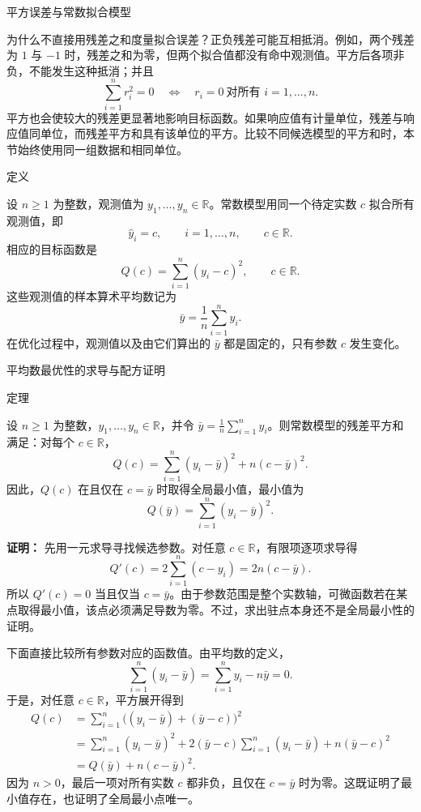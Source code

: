 \documentclass[aspectratio=169,10pt,fontset=fandol]{ctexbeamer}
\begin{document}
\begin{frame}[t,fragile]{平方误差与常数拟合模型}
\footnotesize
{\footnotesize
为什么不直接用残差之和度量拟合误差？正负残差可能互相抵消。例如，两个残差为 $1$ 与 $-1$ 时，残差之和为零，但两个拟合值都没有命中观测值。平方后各项非负，不能发生这种抵消；并且
\[
\sum_{i=1}^{n}r_i^2=0\quad\Longleftrightarrow\quad r_i=0\ \text{对所有 }i=1,\ldots,n.
\]
平方也会使较大的残差更显著地影响目标函数。如果响应值有计量单位，残差与响应值同单位，而残差平方和具有该单位的平方。比较不同候选模型的平方和时，本节始终使用同一组数据和相同单位。\par

}
\begin{block}{定义}
{\footnotesize
设 $n\geq1$ 为整数，观测值为 $y_1,\ldots,y_n\in\mathbb{R}$。常数模型用同一个待定实数 $c$ 拟合所有观测值，即
\[
\hat{y}_i=c,\qquad i=1,\ldots,n,\qquad c\in\mathbb{R}.
\]
相应的目标函数是
\[
Q(c)=\sum_{i=1}^{n}(y_i-c)^2,\qquad c\in\mathbb{R}.
\]
这些观测值的样本算术平均数记为
\[
\bar{y}=\frac{1}{n}\sum_{i=1}^{n}y_i.
\]
在优化过程中，观测值以及由它们算出的 $\bar{y}$ 都是固定的，只有参数 $c$ 发生变化。

}
\end{block}
\end{frame}
\begin{frame}[t,fragile]{平均数最优性的求导与配方证明}
\footnotesize
\begin{block}{定理}
{\footnotesize
设 $n\geq1$ 为整数，$y_1,\ldots,y_n\in\mathbb{R}$，并令 $\bar{y}=\frac{1}{n}\sum_{i=1}^{n}y_i$。则常数模型的残差平方和满足：对每个 $c\in\mathbb{R}$，
\[
Q(c)=\sum_{i=1}^{n}(y_i-\bar{y})^2+n(c-\bar{y})^2.
\]
因此，$Q(c)$ 在且仅在 $c=\bar{y}$ 时取得全局最小值，最小值为
\[
Q(\bar{y})=\sum_{i=1}^{n}(y_i-\bar{y})^2.
\]

}
\end{block}
\pause
{\footnotesize
\textbf{证明：}
先用一元求导寻找候选参数。对任意 $c\in\mathbb{R}$，有限项逐项求导得
\[
Q'(c)=2\sum_{i=1}^{n}(c-y_i)=2n(c-\bar{y}).
\]
所以 $Q'(c)=0$ 当且仅当 $c=\bar{y}$。由于参数范围是整个实数轴，可微函数若在某点取得最小值，该点必须满足导数为零。不过，求出驻点本身还不是全局最小性的证明。

下面直接比较所有参数对应的函数值。由平均数的定义，
\[
\sum_{i=1}^{n}(y_i-\bar{y})=\sum_{i=1}^{n}y_i-n\bar{y}=0.
\]
于是，对任意 $c\in\mathbb{R}$，平方展开得到
\[
\begin{aligned}
Q(c)&=\sum_{i=1}^{n}\bigl((y_i-\bar{y})+(\bar{y}-c)\bigr)^2\\
&=\sum_{i=1}^{n}(y_i-\bar{y})^2
 +2(\bar{y}-c)\sum_{i=1}^{n}(y_i-\bar{y})
 +n(\bar{y}-c)^2\\
&=Q(\bar{y})+n(c-\bar{y})^2.
\end{aligned}
\]
因为 $n>0$，最后一项对所有实数 $c$ 都非负，且仅在 $c=\bar{y}$ 时为零。这既证明了最小值存在，也证明了全局最小点唯一。

}
\end{frame}
\end{document}
